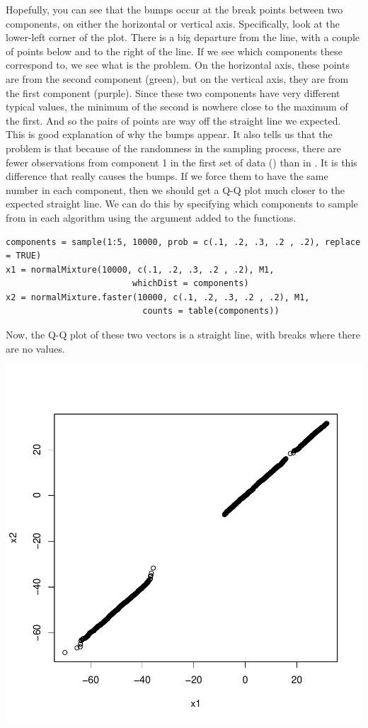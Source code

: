 Hopefully, you can see that the bumps occur at the break points
between two components, on either the horizontal or vertical axis.
Specifically, look at the lower-left corner of the plot.  There is a
big departure from the line, with a couple of points below and to the
right of the line.  If we see which components these correspond to, we
see what is the problem.  On the horizontal axis, these points are
from the second component (green), but on the vertical axis, they are
from the first component (purple).  Since these two components have
very different typical values, the minimum of the second is nowhere
close to the maximum of the first.  And so the pairs of points are way
off the straight line we expected.  This is good explanation of why
the bumps appear.  It also tells us that the problem is that because
of the randomness in the sampling process, there are fewer
observations from component 1 in the first set of data
() than in .  It is this difference that
really causes the bumps.  If we force them to have the same number in
each component, then we should get a Q-Q plot much closer to the
expected straight line.  We can do this by specifying which components
to sample from in each algorithm using the 
argument added to the functions.

\begin{verbatim}
components = sample(1:5, 10000, prob = c(.1, .2, .3, .2 , .2), replace = TRUE)
x1 = normalMixture(10000, c(.1, .2, .3, .2 , .2), M1,
                         whichDist = components)
x2 = normalMixture.faster(10000, c(.1, .2, .3, .2 , .2), M1,
                           counts = table(components))
\end{verbatim}
Now, the Q-Q plot of these two vectors is a straight line,
with  breaks where there are no values.

\includegraphics{RNG/images/SimpleQQEqualCount.pdf}

